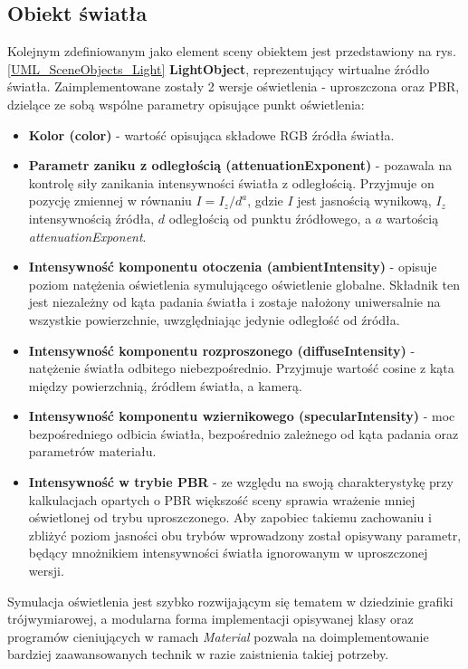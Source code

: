 \subsection{Obiekt światła}
	Kolejnym zdefiniowanym jako element sceny obiektem jest przedstawiony na rys. \ref{UML_SceneObjects_Light} \textbf{LightObject}, reprezentujący wirtualne źródło światła. Zaimplementowane zostały 2 wersje oświetlenia - uproszczona oraz PBR, dzielące ze sobą wspólne parametry opisujące punkt oświetlenia:
	\begin{itemize}
		\item \textbf{Kolor (color)} - wartość opisująca składowe RGB źródła światła.
		\item \textbf{Parametr zaniku z odległością (attenuationExponent)} - pozawala na kontrolę siły zanikania intensywności światła z odległością. Przyjmuje on pozycję zmiennej w równaniu \(I = I_z / d^a\), gdzie \(I\) jest jasnością wynikową, \(I_z\) intensywnością źródła, \(d\) odległością od punktu źródłowego, a \(a\) wartością \textit{attenuationExponent}.
		\item \textbf{Intensywność komponentu otoczenia (ambientIntensity)} - opisuje poziom natężenia oświetlenia symulującego oświetlenie globalne. Składnik ten jest niezależny od kąta padania światła i zostaje nałożony uniwersalnie na wszystkie powierzchnie, uwzględniając jedynie odległość od źródła.
		\item \textbf{Intensywność komponentu rozproszonego (diffuseIntensity)} - natężenie światła odbitego niebezpośrednio. Przyjmuje wartość cosine z kąta między powierzchnią, źródłem światła, a kamerą.
		\item \textbf{Intensywność komponentu wziernikowego (specularIntensity)} - moc bezpośredniego odbicia światła, bezpośrednio zależnego od kąta padania oraz parametrów materiału.
		\item \textbf{Intensywność w trybie PBR} - ze względu na swoją charakterystykę przy kalkulacjach opartych o PBR większość sceny sprawia wrażenie mniej oświetlonej od trybu uproszczonego. Aby zapobiec takiemu zachowaniu i zbliżyć poziom jasności obu trybów wprowadzony został opisywany parametr, będący mnożnikiem intensywności światła ignorowanym w uproszczonej wersji.
	\end{itemize}
	
	Symulacja oświetlenia jest szybko rozwijającym się tematem w dziedzinie grafiki trójwymiarowej, a modularna forma implementacji opisywanej klasy oraz programów cieniujących w ramach \textit{Material} pozwala na doimplementowanie bardziej zaawansowanych technik w razie zaistnienia takiej potrzeby.
	
